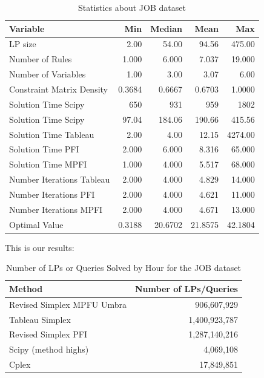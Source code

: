 \begin{table}[!htb]
    \centering
    \caption{Statistics about JOB dataset}
    \begin{tabular}{lrrrr}
        \toprule
        Variable                  & Min    & Median  & Mean    & Max     \\
        \midrule
        LP size                   & 2.00   & 54.00   & 94.56   & 475.00  \\
        Number of Rules           & 1.000  & 6.000   & 7.037   & 19.000  \\
        Number of Variables       & 1.00   & 3.00    & 3.07    & 6.00    \\
        Constraint Matrix Density & 0.3684 & 0.6667  & 0.6703  & 1.0000  \\
        Solution Time Scipy       & 650    & 931     & 959     & 1802    \\
        Solution Time Scipy       & 97.04  & 184.06  & 190.66  & 415.56  \\
        Solution Time Tableau     & 2.00   & 4.00    & 12.15   & 4274.00 \\
        Solution Time PFI         & 2.000  & 6.000   & 8.316   & 65.000  \\
        Solution Time MPFI        & 1.000  & 4.000   & 5.517   & 68.000  \\
        Number Iterations Tableau & 2.000  & 4.000   & 4.829   & 14.000  \\
        Number Iterations PFI     & 2.000  & 4.000   & 4.621   & 11.000  \\
        Number Iterations MPFI    & 2.000  & 4.000   & 4.671   & 13.000  \\
        Optimal Value             & 0.3188 & 20.6702 & 21.8575 & 42.1804 \\
        \bottomrule
    \end{tabular}
\end{table} \label{table_job_stats}

This is our results:
\begin{table}[!htb]
    \centering
    \caption{Number of LPs or Queries Solved by Hour for the JOB dataset}
    \begin{tabular}{l|r}
        \toprule
        Method                     & Number of LPs/Queries \\
        \midrule
        Revised Simplex MPFU Umbra & 906,607,929           \\
        Tableau Simplex            & 1,400,923,787         \\
        Revised Simplex PFI        & 1,287,140,216         \\
        Scipy (method highs)       & 4,069,108             \\
        Cplex                      & 17,849,851            \\
        \bottomrule
    \end{tabular}
\end{table}


